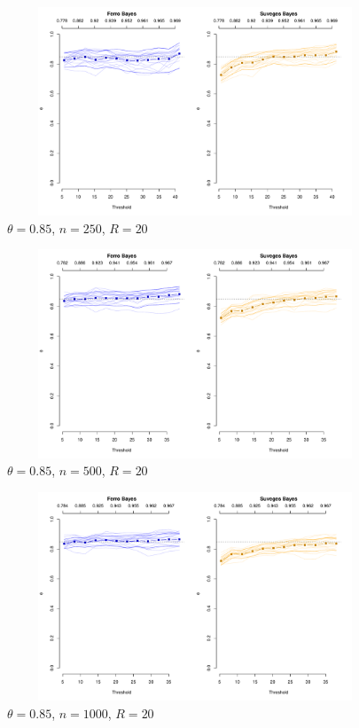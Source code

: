\documentclass[12pt]{article}
\begin{document}
\newpage

\begin{figure}
\begin{center}
\includegraphics[width=5.5in, height=2.45in]{../extremal_comparison/figs/sim_frechet_hier_85_250_20.pdf}
\caption{$\theta=0.85$, $n=250$, $R=20$}
\end{center}
\end{figure}

\begin{figure}
\begin{center}
\includegraphics[width=5.5in, height=2.45in]{../extremal_comparison/figs/sim_frechet_hier_85_500_20.pdf}
\caption{$\theta=0.85$, $n=500$, $R=20$}
\end{center}
\end{figure}

\begin{figure}
\begin{center}
\includegraphics[width=5.5in, height=2.45in]{../extremal_comparison/figs/sim_frechet_hier_85_1000_20.pdf}
\caption{$\theta=0.85$, $n=1000$, $R=20$}
\end{center}
\end{figure}
\end{document}
